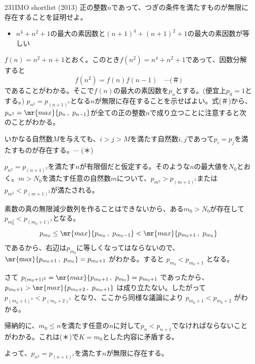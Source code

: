 \begin{prob}{231}{}{IMO shortlist (2013)}
 正の整数$n$であって、つぎの条件を満たすものが無限に存在することを証明せよ。
 \begin{itemize}
  \item[条件:] $n^4+n^2+1$の最大の素因数と$(n+1)^4+(n+1)^2+1$の最大の素因数が等しい 
 \end{itemize}
\end{prob}

$f(n)=n^2+n+1$とおく。このとき$f(n^2)=n^4+n^2+1$であって、因数分解すると
\[ f(n^2)=f(n)f(n-1) \quad\cdots\text{(＃)} \]
であることがわかる。そこで$f(n)$の最大の素因数を$p_n$とする。(便宜上$p_0=1$とする。) $p_{n^2}=p_{(n+1)^2}$となる$n$が無限に存在することを示せばよい。式(＃)から、$p_{n^2}=\mr{max}\{p_n\,,\,\,p_{n-1}\}$が全ての正の整数$n$で成り立つことに注意すると次のことがわかる。

いかなる自然数$M$を与えても、$i>j>M$を満たす自然数$i, j$であって$p_i=p_j$を満たすものが存在する。$\cdots$ (＊)

$p_{n^2}=p_{(n+1)^2}$を満たす$n$が有限個だと仮定する。そのような$n$の最大値を$N_0$とおく。$m>N_0$を満たす任意の自然数$m$について、$p_{m^2}>p_{(m+1)^2}$または$p_{m^2}<p_{(m+1)^2}$が満たされる。

素数の真の無限減少数列を作ることはできないから、ある$m_0>N_0$が存在して$p_{m_0^2}<p_{(m_0+1)^2}$となる。
\[ p_{m_0}\le \mr{max}\{p_{m_0}\,,\,\,p_{m_0-1}\} < \mr{max}\{p_{m_0+1}\,,\,\,p_{m_0}\} \]
であるから、右辺は$p_{m_0}$に等しくなってはならないので、 $\mr{\max}\{p_{m_0+1}\,,\,\,p_{m_0}\}=p_{m_0+1}$ がわかる。すると $p_{m_0}<p_{m_0+1}$ となる。

さて $p_{(m_0+1)^2}=\mr{max}\{p_{m_0+1}\,,\,\,p_{m_0}\}=p_{m_0+1}$ であったから、 $p_{m_0+1}>\mr{max}\{p_{m_0+2}\,,\,\,p_{m_0+1}\}$ は成り立たない。したがって $p_{(m_0+1)^2}<p_{(m_0+2)^2}$ となり、ここから同様な議論により $p_{m_0+1}<p_{m_0+2}$ がわかる。

帰納的に、$m_0\le n$を満たす任意の$n$に対して$p_n<p_{n+1}$でなければならないことがわかる。これは(＊)で$K=m_0$とした内容に矛盾する。

よって、$p_{n^2}=p_{(n+1)^2}$を満たす$n$が無限に存在する。